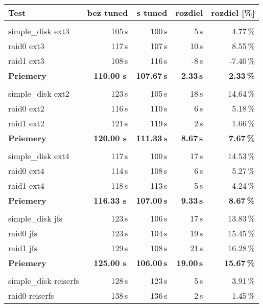 \begin{table}[H]
\begin{center}
\begin{tabular}{|l|r r r r|}
    \hline
    \textbf{Test} & \textbf{bez tuned} & \textbf{s tuned} & \textbf{rozdiel} & \textbf{rozdiel [\%]} \\
    \hline & \\[-1em]\hline
    simple\_disk ext3 & 105\,s & 100\,s & 5\,s & 4.77\,\% \\
    raid0 ext3 & 117\,s & 107\,s & 10\,s & 8.55\,\% \\
    raid1 ext3 & 108\,s & 116\,s & -8\,s & -7.40\,\% \\
    \hline
    \textbf{Priemery} & \textbf{110.00 s}\,& \textbf{107.67\,s} & \textbf{2.33\,s} & \textbf{2.33\,\%} \\
    \hline & \\[-1em]\hline
    simple\_disk ext2 & 123\,s & 105\,s & 18\,s & 14.64\,\% \\
    raid0 ext2 & 116\,s & 110\,s & 6\,s & 5.18\,\% \\
    raid1 ext2 & 121\,s & 119\,s & 2\,s & 1.66\,\% \\
    \hline
    \textbf{Priemery} & \textbf{120.00 s}\,& \textbf{111.33\,s} & \textbf{8.67\,s} & \textbf{7.67\,\%} \\
    \hline & \\[-1em]\hline
    simple\_disk ext4 & 117\,s & 100\,s & 17\,s & 14.53\,\% \\
    raid0 ext4 & 114\,s & 108\,s & 6\,s & 5.27\,\% \\
    raid1 ext4 & 118\,s & 113\,s & 5\,s & 4.24\,\% \\
    \hline
    \textbf{Priemery} & \textbf{116.33 s}\,& \textbf{107.00\,s} & \textbf{9.33\,s} & \textbf{8.67\,\%} \\
    \hline & \\[-1em]\hline
    simple\_disk jfs & 123\,s & 106\,s & 17\,s & 13.83\,\% \\
    raid0 jfs & 123\,s & 104\,s & 19\,s & 15.45\,\% \\
    raid1 jfs & 129\,s & 108\,s & 21\,s & 16.28\,\% \\
    \hline
    \textbf{Priemery} & \textbf{125.00 s}\,& \textbf{106.00\,s} & \textbf{19.00\,s} & \textbf{15.67\,\%} \\
    \hline & \\[-1em]\hline
    simple\_disk reiserfs & 128\,s & 123\,s & 5\,s & 3.91\,\% \\
    raid0 reiserfs & 138\,s & 136\,s & 2\,s & 1.45\,\% \\

\end{tabular}
\end{center}
\end{table}
